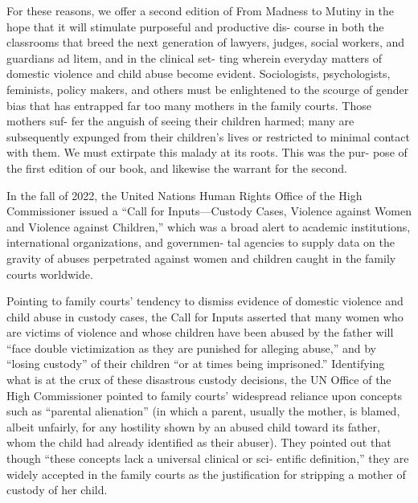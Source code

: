 For these reasons, we offer a second edition of From Madness to
Mutiny in the hope that it will stimulate purposeful and productive dis-
course in both the classrooms that breed the next generation of lawyers,
judges, social workers, and guardians ad litem, and in the clinical set-
ting wherein everyday matters of domestic violence and child abuse
become evident. Sociologists, psychologists, feminists, policy makers,
and others must be enlightened to the scourge of gender bias that has
entrapped far too many mothers in the family courts. Those mothers suf-
fer the anguish of seeing their children harmed; many are subsequently
expunged from their children’s lives or restricted to minimal contact
with them. We must extirpate this malady at its roots. This was the pur-
pose of the first edition of our book, and likewise the warrant for the
second. \pfl{}




In the fall of 2022, the United Nations Human Rights Office of the
High Commissioner issued a “Call for Inputs—Custody Cases, Violence
against Women and Violence against Children,” which was a broad alert
to academic institutions, international organizations, and governmen-
tal agencies to supply data on the gravity of abuses perpetrated against
women and children caught in the family courts worldwide. \pfl{}


Pointing to family courts’ tendency to dismiss evidence of domestic
violence and child abuse in custody cases, the Call for Inputs asserted
that many women who are victims of violence and whose children have
been abused by the father will “face double victimization as they are
punished for alleging abuse,” and by “losing custody” of their children
“or at times being imprisoned.” Identifying what is at the crux of these
disastrous custody decisions, the UN Office of the High Commissioner
pointed to family courts’ widespread reliance upon concepts such as
“parental alienation” (in which a parent, usually the mother, is blamed,
albeit unfairly, for any hostility shown by an abused child toward its
father, whom the child had already identified as their abuser). They
pointed out that though “these concepts lack a universal clinical or sci-
entific definition,” they are widely accepted in the family courts as the
justification for stripping a mother of custody of her child. \pfl{}

